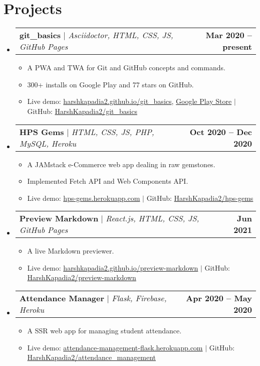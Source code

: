 \documentclass[letterpaper,11pt]{article}
\makeatletter
\newcommand{\resumeItem}[1]{
  \item\small{
    {#1 \vspace{-2pt}}
  }
}
\newcommand{\resumeProjectHeading}[2]{
    \item
    \begin{tabular*}{1.001\textwidth}{l@{\extracolsep{\fill}}r}
      \small#1 & \textbf{\small #2}\\
    \end{tabular*}\vspace{-7pt}
}
\newcommand{\resumeSubHeadingListStart}{\begin{itemize}[leftmargin=0.0in, label={}]}
\newcommand{\resumeSubHeadingListEnd}{\end{itemize}}
\newcommand{\resumeItemListStart}{\begin{itemize}}
\newcommand{\resumeItemListEnd}{\end{itemize}\vspace{-5pt}}
\makeatother
\begin{document}
\section{Projects}
    \vspace{-5pt}
    \resumeSubHeadingListStart
        \resumeProjectHeading
            {\textbf{git\_basics} $|$ \emph{Asciidoctor, HTML, CSS, JS, GitHub Pages}}{Mar 2020 -- present}
            \resumeItemListStart
                \resumeItem{A PWA and TWA for Git and GitHub concepts and commands.}
                \resumeItem{300+ installs on Google Play and 77 stars on GitHub.}
                \resumeItem{Live demo: \href{https://harshkapadia2.github.io/git_basics/}{harshkapadia2.github.io/git\_basics}, \href{https://play.google.com/store/apps/details?id=com.harsh_kapadia.git_basics}{Google Play Store} $|$ GitHub: \href{https://github.com/HarshKapadia2/git_basics}{HarshKapadia2/git\_basics}}
            \resumeItemListEnd
        \vspace{-13pt}

        \resumeProjectHeading
            {\textbf{HPS Gems} $|$ \emph{HTML, CSS, JS, PHP, MySQL, Heroku}}{Oct 2020 -- Dec 2020}
            \resumeItemListStart
                \resumeItem{A JAMstack e-Commerce web app dealing in raw gemstones.}
                \resumeItem{Implemented Fetch API and Web Components API.}
                \resumeItem{Live demo: \href{https://hps-gems.herokuapp.com/}{hps-gems.herokuapp.com} $|$ GitHub: \href{https://github.com/HarshKapadia2/hps-gems}{HarshKapadia2/hps-gems}}
            \resumeItemListEnd
        \vspace{-13pt}
    
        \resumeProjectHeading
            {\textbf{Preview Markdown} $|$ \emph{React.js, HTML, CSS, JS, GitHub Pages}}{Jun 2021}
            \resumeItemListStart
                \resumeItem{A live Markdown previewer.}
                \resumeItem{Live demo: \href{https://harshkapadia2.github.io/preview-markdown/}{harshkapadia2.github.io/preview-markdown} $|$ GitHub: \href{https://github.com/HarshKapadia2/preview-markdown}{HarshKapadia2/preview-markdown}}
            \resumeItemListEnd
        \vspace{-13pt}

        \resumeProjectHeading
            {\textbf{Attendance Manager} $|$ \emph{Flask, Firebase, Heroku}}{Apr 2020 -- May 2020}
            \resumeItemListStart
                \resumeItem{A SSR web app for managing student attendance.}
                \resumeItem{Live demo: \href{https://attendance-management-flask.herokuapp.com/}{attendance-management-flask.herokuapp.com} $|$ GitHub: \href{https://github.com/HarshKapadia2/attendance_management}{HarshKapadia2/attendance\_management}}
            \resumeItemListEnd
    \resumeSubHeadingListEnd
\vspace{-15pt}
\end{document}

